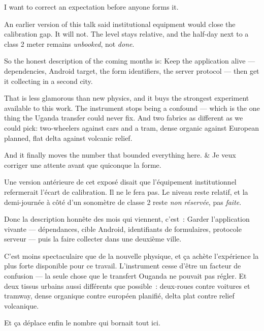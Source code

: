 \documentclass[10pt,a4paper]{article}
\begin{document}
\begin{say}
I want to correct an expectation before anyone forms it.

 An earlier version of
this talk said institutional equipment would close the calibration gap. It will
not. The level stays relative, and the half-day next to a class 2 meter remains
\emph{unbooked}, not \emph{done}.

So the honest description of the coming months is:  Keep the application alive --- dependencies, Android target, the form
identifiers, the server protocol --- then get it collecting in a second city.

That is less glamorous than new physics, and it buys the strongest experiment
available to this work.  The instrument
stops being a confound --- which is the one thing the Uganda transfer could never
fix. And two fabrics as different as we could pick: two-wheelers against cars and
a tram, dense organic against European planned, flat delta against volcanic
relief.

And it finally moves the number that bounded everything here. 
&
Je veux corriger une attente avant que quiconque la forme.

 Une version antérieure de
cet exposé disait que l'équipement institutionnel refermerait l'écart de
calibration. Il ne le fera pas. Le niveau reste relatif, et la demi-journée à côté
d'un sonomètre de classe 2 reste \emph{non réservée}, pas \emph{faite}.

Donc la description honnête des mois qui viennent, c'est~:  Garder l'application vivante --- dépendances, cible Android,
identifiants de formulaires, protocole serveur --- puis la faire collecter dans une
deuxième ville.

C'est moins spectaculaire que de la nouvelle physique, et ça achète l'expérience la
plus forte disponible pour ce travail. 
L'instrument cesse d'être un facteur de confusion --- la seule chose que le
transfert Ouganda ne pouvait pas régler. Et deux tissus urbains aussi différents que
possible~: deux-roues contre voitures et tramway, dense organique contre européen
planifié, delta plat contre relief volcanique.

Et ça déplace enfin le nombre qui bornait tout ici. 
\end{say}
\end{document}

